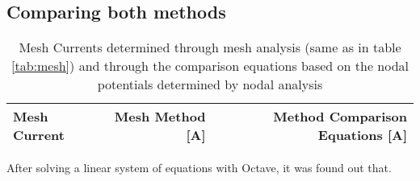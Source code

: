 \subsection{Comparing both methods}
\par
\begin{table}[hbt!]
  \centering
  \begin{tabular}{|l|r|r|}
    \hline    
    {\bf Mesh Current} & {\bf Mesh Method [A]} & {\bf Method Comparison Equations [A]} \\ \hline
    
  \end{tabular}
  \caption{Mesh Currents determined through mesh analysis (same as in table \ref{tab:mesh}) and through the comparison equations based on the nodal potentials determined by nodal analysis}
  \label{tab:comp}
\end{table}
After solving a linear system of equations with Octave, it was found out that. 




